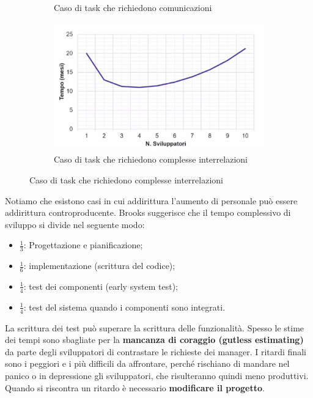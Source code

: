 \begin{figure}[H]
\begin{subfigure}{.24\textwidth}
		\caption{Caso di task che richiedono comunicazioni}
	\end{subfigure}
	\begin{subfigure}{.24\textwidth}
		\centering
		\includegraphics[width=\linewidth]{document/img/nocom.PNG}
		\caption{Caso di task che richiedono complesse interrelazioni}
	\end{subfigure}
\end{figure}
\noindent Notiamo che esistono casi in cui addirittura l'aumento di personale può essere addirittura controproducente.\newline\newline
Brooks suggerisce che il tempo complessivo di sviluppo si divide nel seguente modo:
\begin{itemize}
	\item $\frac{1}{3}$: Progettazione e pianificazione;
	\item $\frac{1}{6}$: implementazione (scrittura del codice);
	\item $\frac{1}{4}$: test dei componenti (early system test);
	\item $\frac{1}{4}$: test del sistema quando i componenti sono integrati.
\end{itemize}
La scrittura dei test può superare la scrittura delle funzionalità.\newline\newline
Spesso le stime dei tempi sono sbagliate per la \textbf{mancanza di coraggio (gutless estimating)} da parte degli sviluppatori di contrastare le richieste dei manager. I ritardi finali sono i peggiori e i più difficili da affrontare, perché rischiano di mandare nel panico o in depressione gli sviluppatori, che risulteranno quindi meno produttivi.\newline
Quando si riscontra un ritardo è necessario \textbf{modificare il progetto}.\newline
